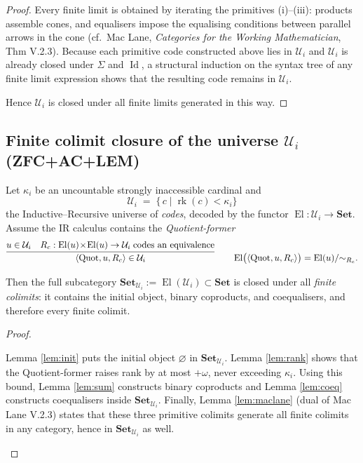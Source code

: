 \documentclass[a4paper,11pt]{article}
\newcommand{\Set}{\mathbf{Set}}
\newcommand{\El}{\operatorname{El}}          %
\newcommand{\rk}{\operatorname{rk}}          %
\begin{document}
\begin{proof}
Every finite limit is obtained by iterating the primitives (i)–(iii):
products assemble cones, and equalisers impose the
equalising conditions between parallel arrows in the cone
(cf.\ Mac Lane, \emph{Categories for the Working Mathematician},
Thm V.2.3).  
Because each primitive code constructed above lies in
$\mathcal U_{i}$ and $\mathcal U_{i}$ is already closed under
$\Sigma$ and $\operatorname{Id}$, a structural induction on the syntax
tree of any finite limit expression shows that the resulting code
remains in $\mathcal U_{i}$.

\medskip
Hence $\mathcal U_{i}$ is closed under all finite limits generated in
this way.
\end{proof}




\subsection{Finite colimit closure of the universe $\mathcal U_i$ {\normalfont(\textsf{ZFC+AC+LEM})}}
\begin{lemma}\label{lem:finite-colim}
Let $\kappa_i$ be an uncountable strongly inaccessible cardinal and  
\[
\mathcal U_i\;=\;\bigl\{\,c\mid \rk(c)<\kappa_i\bigr\}
\]
the Inductive–Recursive universe of \emph{codes}, decoded by the functor  
\(
\El\colon\mathcal U_i\to\mathbf{Set}.
\)
Assume the IR calculus contains the \emph{Quotient-former}
\[
\infer{\langle\mathrm{Quot},u,R_c\rangle\in\mathcal U_i}
      {u\in\mathcal U_i \quad
       R_c:\El(u)\!\times\!\El(u)\to\mathcal U_i\;
       \text{codes an equivalence}}
\qquad
\El\bigl(\langle\mathrm{Quot},u,R_c\rangle\bigr)=\El(u)/{\sim_{R_c}}.
\]

Then the full subcategory
\(
\Set_{\mathcal U_i}:=\El(\mathcal U_i)\subset\mathbf{Set}
\)
is closed under all \emph{finite colimits}:
it contains the initial object, binary coproducts, and coequalisers, and
therefore every finite colimit.
\end{lemma}

\begin{proof}\begin{linenumbers}
Lemma \ref{lem:init} puts the initial object $\varnothing$
in $\Set_{\mathcal U_i}$.
Lemma \ref{lem:rank} shows that the Quotient-former raises rank by
at most $+\omega$, never exceeding $\kappa_i$.
Using this bound, Lemma \ref{lem:sum} constructs binary coproducts and
Lemma \ref{lem:coeq} constructs coequalisers inside $\Set_{\mathcal U_i}$.
Finally, Lemma \ref{lem:maclane} (dual of Mac Lane V.2.3) states that these
three primitive colimits generate all finite colimits in any category,
hence in $\Set_{\mathcal U_i}$ as well.
\end{linenumbers}\end{proof}
\end{document}
